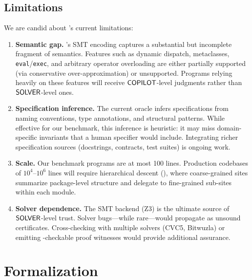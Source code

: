 \subsection{Limitations}\label{sec:limitations}

We are candid about \JuGeo{}'s current limitations:

\begin{enumerate}[leftmargin=1.5em]
  \item \textbf{Semantic gap.}
    \JuGeo{}'s SMT encoding captures a substantial but incomplete
    fragment of \Python{} semantics.  Features such as dynamic
    dispatch, metaclasses, \texttt{eval}/\texttt{exec}, and
    arbitrary operator overloading are either partially supported
    (via conservative over-approximation) or unsupported.  Programs
    relying heavily on these features will receive $\mathsf{COPILOT}$-level
    judgments rather than $\mathsf{SOLVER}$-level ones.

  \item \textbf{Specification inference.}
    The current oracle infers specifications from naming conventions,
    type annotations, and structural patterns.  While effective for
    our benchmark, this inference is heuristic: it may miss
    domain-specific invariants that a human specifier would include.
    Integrating richer specification sources (docstrings, contracts,
    test suites) is ongoing work.

  \item \textbf{Scale.}
    Our benchmark programs are at most 100 lines.  Production
    codebases of $10^4$--$10^6$ lines will require hierarchical
    descent (), where coarse-grained
    sites summarize package-level structure and delegate to
    fine-grained sub-sites within each module.

  \item \textbf{Solver dependence.}
    The SMT backend (Z3) is the ultimate source of $\mathsf{SOLVER}$-level
    trust.  Solver bugs---while rare---would propagate as unsound
    certificates.  Cross-checking with multiple solvers (CVC5, Bitwuzla)
    or emitting \LEAN{}-checkable proof witnesses would provide
    additional assurance.
\end{enumerate}


\section{\LEAN{} Formalization}\label{sec:lean}

